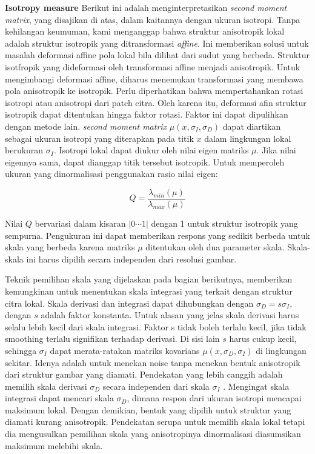 \textbf{Isotropy measure} Berikut ini adalah menginterpretasikan \emph{second moment matrix}, yang disajikan 
di atas, dalam kaitannya dengan ukuran isotropi. Tanpa kehilangan keumuman, kami menganggap bahwa struktur 
anisotropik lokal adalah struktur isotropik yang ditransformasi \emph{affine}. Ini memberikan solusi untuk 
masalah deformasi affine pola lokal bila dilihat dari sudut yang berbeda. Struktur isotfropik yang 
dideformasi oleh transformasi affine menjadi anisotropik. Untuk mengimbangi deformasi affine, 
diharus menemukan transformasi yang membawa pola anisotropik ke isotropik. 
Perlu diperhatikan bahwa mempertahankan rotasi isotropi atau anisotropi dari patch citra.
Oleh karena itu, deformasi afin struktur isotropik dapat ditentukan hingga faktor rotasi. 
Faktor ini dapat dipulihkan dengan metode lain. \emph{second moment matrix} \(\mu(x,\sigma_{I},\sigma_{D})\)
dapat diartikan sebagai ukuran isotropi yang diterapkan pada titik \(x\) dalam lingkungan lokal berukuran \(\sigma_{I}\). 
Isotropi lokal dapat diukur oleh nilai eigen matriks \(\mu\). Jika nilai eigennya sama, dapat dianggap titik tersebut isotropik. 
Untuk memperoleh ukuran yang dinormalisasi penggunakan rasio nilai eigen:

\begin{equation}
  Q = \frac{\lambda_{min}(\mu)}{\lambda_{max}(\mu)}
\end{equation}

Nilai \(Q\) bervariasi dalam kisaran \(\left| 0 \cdots  1\right|\) dengan 1 untuk struktur isotropik yang sempurna. 
Pengukuran ini dapat memberikan respons yang sedikit berbeda untuk skala yang berbeda karena matriks \(\mu\) 
ditentukan oleh dua parameter skala. Skala-skala ini harus dipilih secara independen dari resolusi gambar.

Teknik pemilihan skala yang dijelaskan pada bagian berikutnya, memberikan kemungkinan untuk menentukan skala integrasi yang 
terkait dengan struktur citra lokal. Skala derivasi dan integrasi dapat dihubungkan dengan \(\sigma_{D}=s \sigma_{I}\), dengan \(s\) adalah 
faktor konstanta. Untuk alasan yang jelas skala derivasi harus selalu lebih kecil dari skala integrasi. Faktor s tidak boleh 
terlalu kecil, jika tidak smoothing terlalu signifikan terhadap derivasi. Di sisi lain \(s\) harus cukup kecil, sehingga \(\sigma_{I}\) dapat 
merata-ratakan matriks kovarians \(\mu(x,\sigma_{D},\sigma_{I})\) di lingkungan sekitar. Idenya adalah untuk menekan noise tanpa menekan bentuk 
anisotropik dari struktur gambar yang diamati. Pendekatan yang lebih canggih adalah memilih skala derivasi \(\sigma_{D}\) secara independen 
dari skala \(\sigma_{I}\) . Mengingat skala integrasi  dapat mencari skala \(\sigma_{D}\), dimana respon dari ukuran isotropi mencapai maksimum lokal. 
Dengan demikian, bentuk yang dipilih untuk struktur yang diamati kurang anisotropik. Pendekatan serupa untuk memilih skala lokal tetapi dia mengusulkan pemilihan skala yang anisotropinya dinormalisasi diasumsikan 
maksimum melebihi skala.

